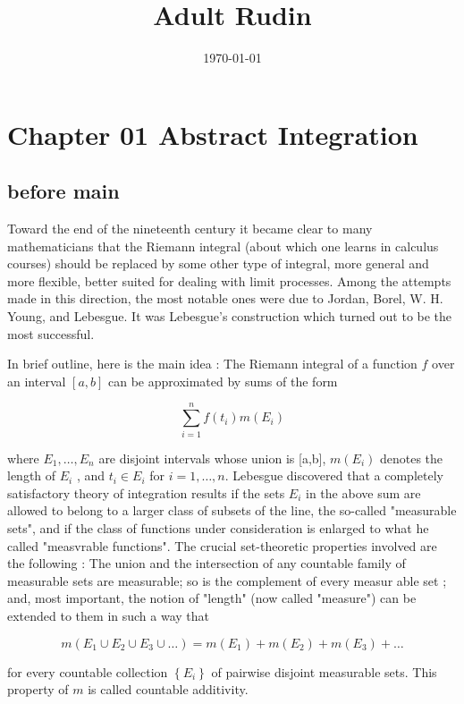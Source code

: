\documentclass[11pt]{article}
\date{\today}
\title{Adult Rudin}
\begin{document}
\maketitle
\setcounter{tocdepth}{2}
\tableofcontents

\section{Chapter 01 Abstract Integration}
\label{sec:org15afe60}

\subsection{before main}
\label{sec:org534455a}

Toward the end of the nineteenth century it became clear to many mathematicians that the Riemann integral (about which one learns in calculus courses) should be replaced by some other type of integral, more general and more flexible, better suited for dealing with limit processes. Among the attempts made in this direction, the most notable ones were due to Jordan, Borel, W. H. Young, and Lebesgue. It was Lebesgue's construction which turned out to be the most successful.

In brief outline, here is the main idea : The Riemann integral of a function \(f\) over an interval \([a,b]\) can be approximated by sums of the form

\[\sum _{i=1} ^{n} f(t_{i})m(E_{i})\]

where \(E_{1}, \dots , E_{n}\) are disjoint intervals whose union is [a,b], \(m (E_{i})\) denotes the length of \(E_{i}\) , and \(t_{i} \in E_{i}\) for \(i = 1, \dots, n\). Lebesgue discovered that a completely satisfactory theory of integration results if the sets \(E_{i}\) in the above sum are allowed to belong to a larger class of subsets of the line, the so-called "measurable sets", and if the class of functions under consideration is enlarged to what he called "measvrable functions". The crucial set-theoretic properties involved are the following : The union and the intersection of any countable family of measurable sets are measurable; so is the complement of every measur able set ; and, most important, the notion of "length" (now called "measure") can be extended to them in such a way that

\[m (E_{1} \cup E_{2} \cup E_{3} \cup \dots) = m(E_{1}) + m(E_{2}) + m(E_{3}) + \dots\]

for every countable collection \(\left\{E_i\right\}\) of pairwise disjoint measurable sets. This property of \(m\) is called countable additivity.
\end{document}

